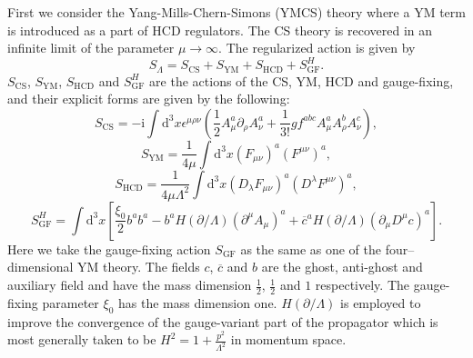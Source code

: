 \documentclass[a4paper,12pt]{article}
\begin{document}
First we consider the Yang-Mills-Chern-Simons (YMCS) theory
where a YM term is introduced as a part of HCD regulators.
%
The CS theory is recovered in an infinite limit of the parameter
$\mu\rightarrow\infty$.
%
The regularized action is given by
%
\begin{equation}
S_\Lambda = S_\mathrm{CS} + S_\mathrm{YM}
 + S_\mathrm{HCD} + S_\mathrm{GF}^H.
\label{eq:regularized YMCS action}
\end{equation}
%
$S_\mathrm{CS}$, $S_\mathrm{YM}$, $S_\mathrm{HCD}$ and $S_\mathrm{GF}^H$
are the actions of the CS, YM, HCD and gauge-fixing,
%
and their explicit forms are given by the following:
%
\begin{equation}
S_\mathrm{CS} =
-\mathrm{i}
\int \mathrm{d}^3 x 
\epsilon^{\mu\rho\nu}
\left(
\frac{1}{2}A_\mu^a \partial_\rho A_\nu^a
+\frac{1}{3!}gf^{abc}A_\mu^a A_\rho^b A_\nu^c
\right),
\label{eq:CS action}
\end{equation}
%
\begin{equation}
S_\mathrm{YM} =
\frac{1}{ 4\mu}
\int \mathrm{d}^3 x 
\left( F_{\mu\nu} \right)^a
\left( F^{\mu\nu} \right)^a,
\label{eq:YM action}
\end{equation}
%
\begin{equation}
S_\mathrm{HCD} =
\frac{1}{ 4\mu \Lambda^2}
\int \mathrm{d}^3 x 
\left( D_\lambda F_{\mu\nu} \right)^a
\left( D^\lambda F^{\mu\nu} \right)^a,
\label{eq:HCD action}
\end{equation}
%
\begin{equation}
S_\mathrm{GF}^H =
\int \mathrm{d}^3 x
\left[
 \frac{\xi_0 }{ 2} b^a b^a
 -
 b^a H(\partial/\Lambda) (\partial^\mu A_\mu)^a
 +
 \overline c^a H(\partial/\Lambda) 
 (\partial_\mu D^\mu c)^a
\right].
\label{eq:GF action}
\end{equation}
%
Here we take the gauge-fixing action $S_\mathrm{GF}$
as the same as one of the four--dimensional YM theory.
%
The fields $c$, $\overline c$ and $b$
are the ghost, anti-ghost and auxiliary field
and have the mass dimension $\frac{1}{2}$, $\frac{1}{2}$ and $1$ 
respectively.
%
The gauge-fixing parameter $\xi_0$ has the mass dimension one.
%
$H(\partial / \Lambda)$ is employed
to improve the convergence of the gauge-variant part of the propagator
which is most generally taken to be 
$H^2 = 1 + \frac{p^2}{\Lambda^2}$ in momentum space.
%
\end{document}
